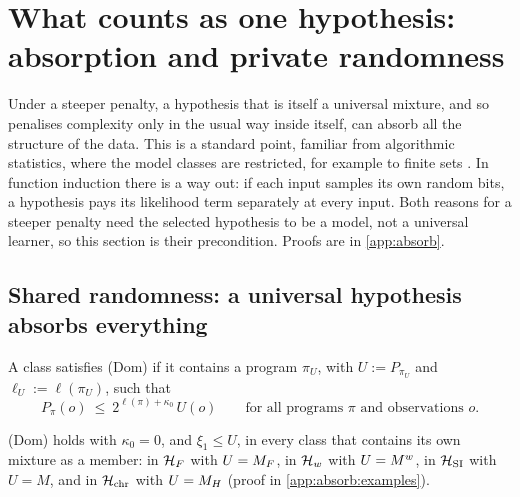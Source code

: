 \section{What counts as one hypothesis: absorption and private randomness}\label{sec:absorb}

Under a steeper penalty, a hypothesis that is itself a universal mixture, and so penalises complexity only in the usual way inside itself, can absorb all the structure of the data. This is a standard point, familiar from algorithmic statistics, where the model classes are restricted, for example to finite sets \citep{gacs2001algorithmic,vereshchagin2017algorithmic}. In function induction there is a way out: if each input samples its own random bits, a hypothesis pays its likelihood term separately at every input. Both reasons for a steeper penalty need the selected hypothesis to be a model, not a universal learner, so this section is their precondition. Proofs are in \cref{app:absorb}.

\subsection{Shared randomness: a universal hypothesis absorbs everything}\label{sec:absorb:shared}

A class satisfies (Dom) if it contains a program $\pi_U$, with $U:=P_{\pi_U}$ and $\ell_U:=\ell(\pi_U)$, such that
\begin{equation}\label{eq:absorb:dom}
P_\pi(o)\ \le\ 2^{\ell(\pi)+\kappa_0}\,U(o)\qquad\text{for all programs $\pi$ and observations $o$.}\tag{Dom}
\end{equation}

\begin{remark}\label{rem:absorb:examples}
(Dom) holds with $\kappa_0=0$, and $\xi_1\le U$, in every class that contains its own mixture as a member: in $\mathcal{H}_{F}$ with $U=M_{F}$, in $\mathcal{H}_{w}$ with $U=M^{w}$, in $\mathcal{H}_{\mathrm{SI}}$ with $U=M$, and in $\mathcal{H}_{\mathrm{chr}}$ with $U=M_{H}$ (proof in \cref{app:absorb:examples}).
\end{remark}

